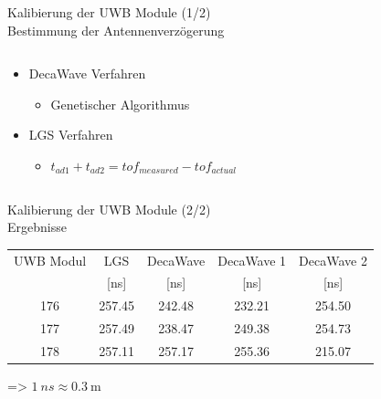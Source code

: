 \documentclass{beamer}
\begin{document}
\begin{frame}{Kalibierung der UWB Module (1/2)\\\normalsize{Bestimmung der Antennenverzögerung}}
\begin{columns}
		\begin{column}{0.5\linewidth}
			\begin{itemize}
				\item DecaWave Verfahren
					\begin{itemize}
						\item Genetischer Algorithmus
					\end{itemize}
				\item LGS Verfahren
					\begin{itemize}
						\item $t_{ad1} + t_{ad2} = tof_{measured} - tof_{actual}$
					\end{itemize}
			\end{itemize}
		\end{column}
	\end{columns}
\end{frame}


%
%


%
%
%
\begin{frame}{Kalibierung der UWB Module (2/2)\\\normalsize{Ergebnisse}}
	\centering
	\begin{table}
		\centering
		\begin{tabular}{||c||c||ccc||}
			\hline
			UWB Modul & LGS & DecaWave & DecaWave 1 & DecaWave 2 \\
			& [\si{\nano\second}] & [\si{\nano\second}] & [\si{\nano\second}] & [\si{\nano\second}] \\
			\hline
			\hline
			176 & \num{257.45} & \num{242.48} & \num{232.21} & \num{254.50} \\
			177 & \num{257.49} & \num{238.47} & \num{249.38} & \num{254.73} \\
			178 & \num{257.11} & \num{257.17} & \num{255.36} & \num{215.07} \\
			\hline
		\end{tabular}
	\end{table}
	\par\bigskip
	$\text{=> } \SI{1}{ns} \approx \SI{0.3}{\meter}$
\end{frame}
\end{document}
